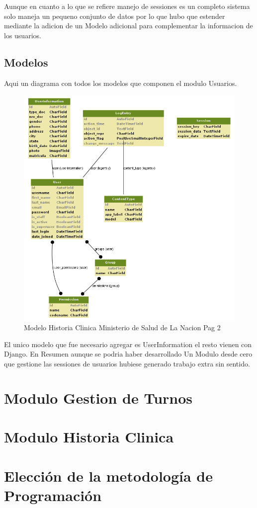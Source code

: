 Aunque en cuanto a lo que se refiere manejo de sessiones es un completo sistema
solo maneja un pequeno conjunto de datos por lo que hubo que estender mediante 
la adicion de un Modelo adicional para complementar la informacion de los 
usuarios.

\subsection{Modelos}

Aqui un diagrama con todos los modelos que componen el modulo Usuarios.

\begin{figure}[H]
    \centering
    \includegraphics[scale=0.7]{resourse/auth.png}
    \caption{Modelo Historia Clinica Ministerio de Salud de La Nacion Pag 2}
    \label{fig:07}
\end{figure}

El unico modelo que fue necesario agregar es UserInformation el resto vienen
con Django. En Resumen aunque se podria haber desarrollado Un Modulo desde
 cero que gestione las sessiones de usuarios hubiese generado trabajo extra sin
 sentido.

\section{Modulo Gestion de Turnos}

\section{Modulo Historia Clinica}

\section{Elecci\'on de la metodolog\'ia de Programaci\'on}

